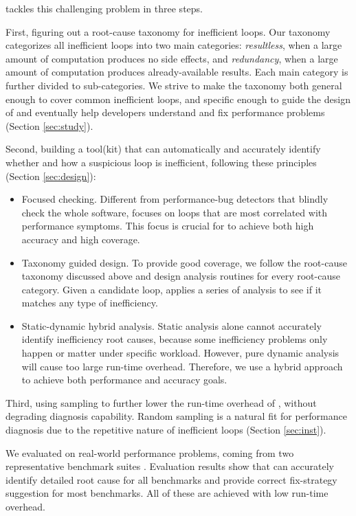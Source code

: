 \Tool tackles this challenging problem in three steps.

First, figuring out a root-cause taxonomy for inefficient loops.
Our taxonomy categorizes all inefficient loops into two main categories:
\emph{resultless}, when a large amount of computation produces
no side effects, and \emph{redundancy}, when a large amount of 
computation produces already-available results.
Each main category is further divided to sub-categories.
We strive to make the taxonomy both general enough to cover
common inefficient loops, and specific enough to guide the design
of \Tool and eventually help developers understand
and fix performance problems
(Section \ref{sec:study}).
 
Second, building a tool(kit) \Tool that can automatically and accurately
identify whether and how a suspicious loop is inefficient, 
following these principles (Section \ref{sec:design}):

\begin{itemize}
\item Focused checking. 
Different from performance-bug detectors that blindly check the whole
software, \Tool focuses on loops that are
most correlated with performance symptoms. 
This focus is crucial for \Tool to achieve both high
accuracy and high coverage.

\item Taxonomy guided design. To provide good coverage, we follow
the root-cause taxonomy discussed above and design analysis routines for
every root-cause category. Given a candidate loop, \Tool
applies a series of analysis to see if it matches any type of inefficiency.

\item Static-dynamic hybrid analysis.
Static analysis alone cannot accurately identify 
inefficiency root causes, because some inefficiency problems only
happen or matter under specific workload. However, pure dynamic analysis will 
cause too large 
run-time overhead. Therefore, we use a hybrid approach to achieve both
performance and accuracy goals.
\end{itemize}

Third, using sampling to further lower the run-time overhead of \Tool, without
degrading diagnosis capability. Random sampling is a natural fit for performance
diagnosis due to the repetitive nature of inefficient loops (Section \ref{sec:inst}).

We evaluated \Tool on \allbugs real-world performance problems,
coming from two representative benchmark suites 
\cite{SongOOPSLA2014,Alabama}. 
Evaluation results show that \Tool can accurately identify detailed
root cause for all benchmarks and provide correct fix-strategy suggestion for
most benchmarks. All of these are achieved with low run-time overhead.

